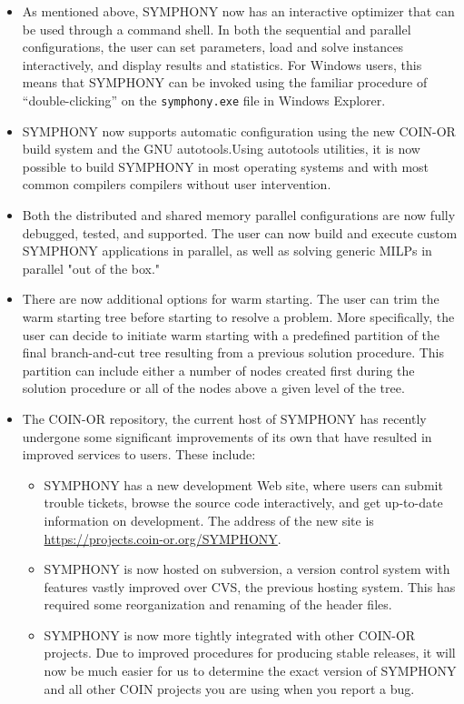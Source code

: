 \begin{itemize}

\item As mentioned above, SYMPHONY now has an interactive optimizer that can
be used through a command shell. In both the sequential and parallel
configurations, the user can set parameters, load and solve instances
interactively, and display results and statistics. For Windows users, this
means that SYMPHONY can be invoked using the familiar procedure of
``double-clicking'' on the \texttt{symphony.exe} file in Windows Explorer.

\item SYMPHONY now supports automatic configuration using the new COIN-OR build
system and the GNU autotools.Using autotools utilities, it is now possible to
build SYMPHONY in most operating systems and with most common compilers
compilers without user intervention.

\item Both the distributed and shared memory parallel configurations are now
fully debugged, tested, and supported. The user can now build and execute
custom SYMPHONY applications in parallel, as well as solving generic MILPs in
parallel "out of the box."

\item There are now additional options for warm starting. The user can trim the
warm starting tree before starting to resolve a problem. More specifically,
the user can decide to initiate warm starting with a predefined partition of
the final branch-and-cut tree resulting from a previous solution procedure.
This partition can include either a number of nodes created first during the
solution procedure or all of the nodes above a given level of the tree.

\item The COIN-OR repository, the current host of SYMPHONY has
  recently undergone some significant improvements of its own that have
  resulted in improved services to users. These include: 

\begin{itemize}

\item SYMPHONY has a new development Web site, where users can submit trouble
  tickets, browse the source code interactively, and get up-to-date
  information on development. The address of the new site is
  \url{https://projects.coin-or.org/SYMPHONY}.

\item SYMPHONY is now hosted on subversion, a version control system with
  features vastly improved over CVS, the previous hosting system. This has
  required some reorganization and renaming of the header files.

\item SYMPHONY is now more tightly integrated with other COIN-OR projects. Due
  to improved procedures for producing stable releases, it will now be much
  easier for us to determine the exact version of SYMPHONY and all other COIN
  projects you are using when you report a bug.

\end{itemize}

\end{itemize}

